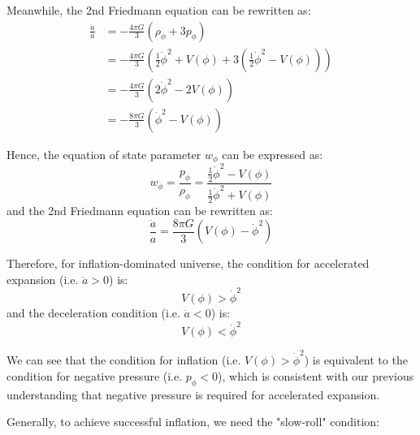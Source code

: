 \bigskip \noindent
\begin{foundation}
    Meanwhile, the 2nd Friedmann equation can be rewritten as:
    \begin{align*}
        \frac{\ddot{a}}{a} &= - \frac{4 \pi G}{3} (\rho_\phi + 3 p_\phi) \\
        &= - \frac{4 \pi G}{3} \left( \frac{1}{2} \dot{\phi}^2 + V(\phi) + 3 \left( \frac{1}{2} \dot{\phi}^2 - V(\phi) \right) \right) \\
        &= - \frac{4 \pi G}{3} \left( 2 \dot{\phi}^2 - 2 V(\phi) \right) \\
        &= - \frac{8 \pi G}{3} \left( \dot{\phi}^2 - V(\phi) \right)
    \end{align*}
\end{foundation}

\begin{theory}
    Hence, the equation of state parameter $w_\phi$ can be expressed as:
    \[
    w_\phi = \frac{p_\phi}{\rho_\phi} = \frac{\frac{1}{2} \dot{\phi}^2 - V(\phi)}{\frac{1}{2} \dot{\phi}^2 + V(\phi)}
    \]
    and the 2nd Friedmann equation can be rewritten as:
    \[
        \frac{\ddot{a}}{a} = \frac{8 \pi G}{3} \left( V(\phi) - \dot{\phi}^2 \right)
    \]

    Therefore, for inflation-dominated universe, the condition for accelerated expansion (i.e. $\ddot{a} > 0$) is:
    \[
        V(\phi) > \dot{\phi}^2
    \]
    and the deceleration condition (i.e. $\ddot{a} < 0$) is:
    \[
        V(\phi) < \dot{\phi}^2
    \]
\end{theory}

\bigskip \noindent
\begin{intuition}
    We can see that the condition for inflation (i.e. $V(\phi) > \dot{\phi}^2$) is equivalent to the condition for negative pressure (i.e. $p_\phi < 0$), which is consistent with our previous understanding that negative pressure is required for accelerated expansion. 

    Generally, to achieve successful inflation, we need the "slow-roll" condition:
\end{intuition}

